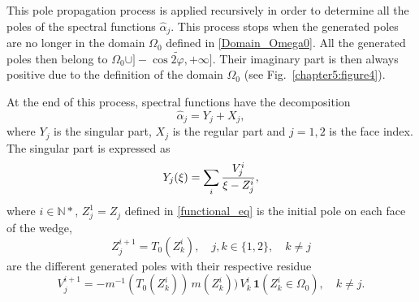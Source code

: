 This pole propagation process is applied recursively in order to determine all the poles of the spectral functions $\hat{\alpha}_j$. This process stops when the generated poles are no longer in the domain $\Omega_0$ defined in \eqref{Domain_Omega0}. All the generated poles then belong to $\Omega_0 \cup \rbrack-\cos \widetilde{2\varphi}, +\infty \rbrack$. Their imaginary part is then always positive due to the definition of the domain $\Omega_0$ (see Fig.~\ref{chapter5:figure4}).

At the end of this process, spectral functions have the decomposition
\begin{equation}
\label{spec_decomp}
\hat{\alpha}_j=Y_j+X_j, 
\end{equation}
where  $Y_j$ is the singular part, $X_j$ is the regular part  and $j=1,2$ is the face index. The singular part is expressed as
\begin{equation}
\label{sing_part}
 Y_j(\xi) = \sum_i {V_j^{i} \over \xi - Z_j^{i}},
\end{equation}
where $i \in \mathbb{N}*$, $Z_j^{1} = Z_j$ defined in \eqref{functional_eq} is the initial pole on each face of the wedge,
\begin{equation}
\label{Generated_poles}
Z_j^{i+1} = T_0(Z_k^{i}), \quad j,k \in \{1,2\}, \quad k \not= j 
\end{equation} 
are the different generated poles with their respective residue 
\begin{equation}
\label{Generated_residues}
V_j^{i+1}=-m^{-1}(T_0(Z_k^{i})) \,  m(Z_k^{i})) \, V_k^{i} \, \mathbf{1}(Z_k^{i} \in \Omega_0), \quad k \neq j.
\end{equation}
